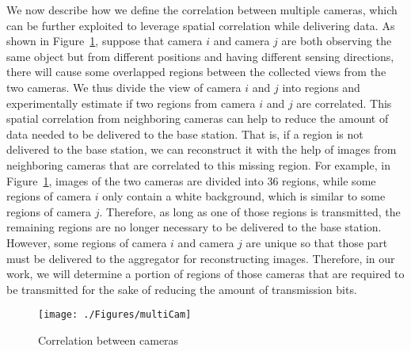 We now describe how we define the correlation between multiple cameras, which can be further exploited to leverage spatial correlation while delivering data.
As shown in Figure~\ref{fig::multiCam}, suppose that camera $i$ and camera $j$ are both observing the same object but from different positions and having different sensing directions, there will cause some overlapped regions between the collected views from the two cameras.
We thus divide the view of camera $i$ and $j$ into regions and experimentally estimate if two regions from camera $i$ and $j$ are correlated.
This spatial correlation from neighboring cameras can help to reduce the amount of data needed to be delivered to the base station.
That is, if a region is not delivered to the base station, we can reconstruct it with the help of images from neighboring cameras that are correlated to this missing region.
%
For example, in Figure~\ref{fig::multiCam}, images of the two cameras are divided into $36$ regions, while some regions of camera $i$ only contain a white background, which is similar to some regions of camera $j$.
Therefore, as long as one of those regions is transmitted, the remaining regions are no longer necessary to be delivered to the base station.
However, some regions of camera $i$ and camera $j$ are unique so that those part must be delivered to the aggregator for reconstructing images.
Therefore, in our work, we will determine a portion of regions of those cameras that are required to be transmitted for the sake of reducing the amount of transmission bits.
%
\begin{figure}
\begin{center}
\texttt{[image: ./Figures/multiCam]}
\caption{\label{fig::multiCam}Correlation between cameras}
\end{center}
\end{figure}
%